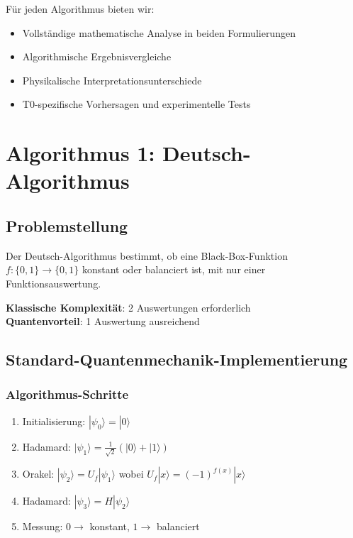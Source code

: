 	Für jeden Algorithmus bieten wir:
	\begin{itemize}
		\item Vollständige mathematische Analyse in beiden Formulierungen
		\item Algorithmische Ergebnisvergleiche
		\item Physikalische Interpretationsunterschiede
		\item T0-spezifische Vorhersagen und experimentelle Tests
	\end{itemize}
	
	\section{Algorithmus 1: Deutsch-Algorithmus}
	
	\subsection{Problemstellung}
	
	Der Deutsch-Algorithmus bestimmt, ob eine Black-Box-Funktion $f: \{0,1\} \rightarrow \{0,1\}$ konstant oder balanciert ist, mit nur einer Funktionsauswertung.
	
	\textbf{Klassische Komplexität}: 2 Auswertungen erforderlich \\
	\textbf{Quantenvorteil}: 1 Auswertung ausreichend
	
	\subsection{Standard-Quantenmechanik-Implementierung}
	
	\subsubsection{Algorithmus-Schritte}
	\begin{enumerate}
		\item Initialisierung: $|\psi_0\rangle = |0\rangle$
		\item Hadamard: $|\psi_1\rangle = \frac{1}{\sqrt{2}}(|0\rangle + |1\rangle)$
		\item Orakel: $|\psi_2\rangle = U_f|\psi_1\rangle$ wobei $U_f|x\rangle = (-1)^{f(x)}|x\rangle$
		\item Hadamard: $|\psi_3\rangle = H|\psi_2\rangle$
		\item Messung: $0 \rightarrow$ konstant, $1 \rightarrow$ balanciert
	\end{enumerate}
	
